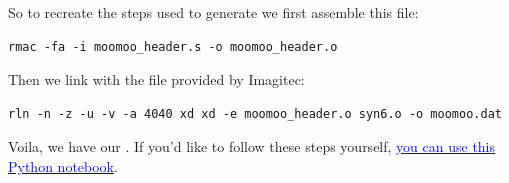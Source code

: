 So to recreate the steps used to generate  we first assemble this file:

\begin{lstlisting}
rmac -fa -i moomoo_header.s -o moomoo_header.o
\end{lstlisting}

Then we link  with the  file provided by Imagitec:
\begin{lstlisting}
rln -n -z -u -v -a 4040 xd xd -e moomoo_header.o syn6.o -o moomoo.dat
\end{lstlisting}

Voila, we have our . If you'd like to follow these steps yourself, \href{https://github.com/mwenge/t2k-25easypieces/blob/master/notebooks/Recreate%20moo.dat/Recreate%20moomoo.dat%20using%20syn6.o.ipynb}{\textcolor{blue}{you can use this Python notebook}}.

